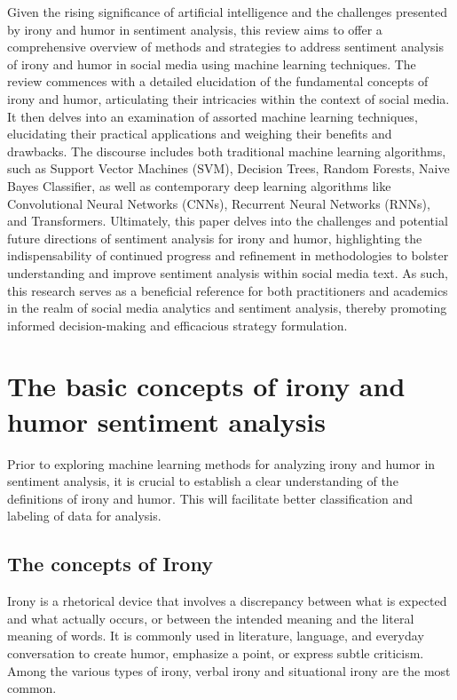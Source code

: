\documentclass[a4paper]{article}
\begin{document}
Given the rising significance of artificial intelligence and the challenges presented by irony and humor in sentiment analysis, this review aims to offer a comprehensive overview of methods and strategies to address sentiment analysis of irony and humor in social media using machine learning techniques. The review commences with a detailed elucidation of the fundamental concepts of irony and humor, articulating their intricacies within the context of social media. It then delves into an examination of assorted machine learning techniques, elucidating their practical applications and weighing their benefits and drawbacks. The discourse includes both traditional machine learning algorithms, such as Support Vector Machines (SVM), Decision Trees, Random Forests, Naive Bayes Classifier, as well as contemporary deep learning algorithms like Convolutional Neural Networks (CNNs), Recurrent Neural Networks (RNNs), and Transformers. Ultimately, this paper delves into the challenges and potential future directions of sentiment analysis for irony and humor, highlighting the indispensability of continued progress and refinement in methodologies to bolster understanding and improve sentiment analysis within social media text. As such, this research serves as a beneficial reference for both practitioners and academics in the realm of social media analytics and sentiment analysis, thereby promoting informed decision-making and efficacious strategy formulation.

\section{The basic concepts of irony and humor sentiment analysis}

Prior to exploring machine learning methods for analyzing irony and humor in sentiment analysis, it is crucial to establish a clear understanding of the definitions of irony and humor. This will facilitate better classification and labeling of data for analysis.

\subsection{The concepts of Irony}

Irony is a rhetorical device that involves a discrepancy between what is expected and what actually occurs, or between the intended meaning and the literal meaning of words. It is commonly used in literature, language, and everyday conversation to create humor, emphasize a point, or express subtle criticism. Among the various types of irony, verbal irony and situational irony are the most common.\cite{ref_concept1,ref_concept2}
\end{document}
